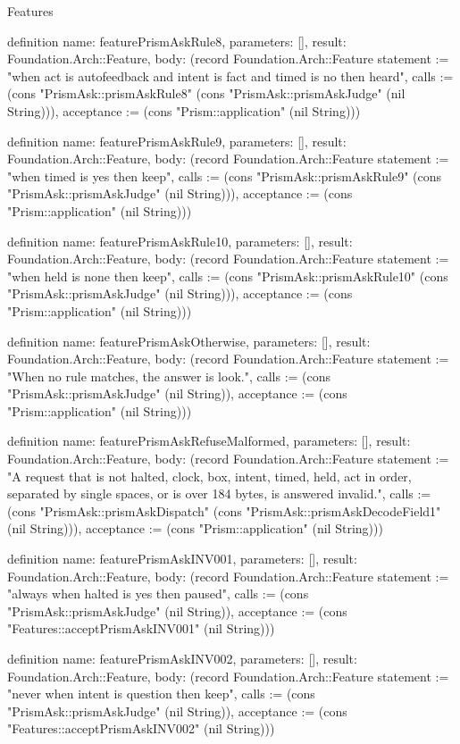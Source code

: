 \begin{lexlean}{Features}
\begin{semanticmodule}
definition{
  name: featurePrismAskRule8,
  parameters: [],
  result: Foundation.Arch::Feature,
  body: (record Foundation.Arch::Feature {statement := "when act is autofeedback and intent is fact and timed is no then heard", calls := (cons "PrismAsk::prismAskRule8" (cons "PrismAsk::prismAskJudge" (nil String))), acceptance := (cons "Prism::application" (nil String))})
}

definition{
  name: featurePrismAskRule9,
  parameters: [],
  result: Foundation.Arch::Feature,
  body: (record Foundation.Arch::Feature {statement := "when timed is yes then keep", calls := (cons "PrismAsk::prismAskRule9" (cons "PrismAsk::prismAskJudge" (nil String))), acceptance := (cons "Prism::application" (nil String))})
}

definition{
  name: featurePrismAskRule10,
  parameters: [],
  result: Foundation.Arch::Feature,
  body: (record Foundation.Arch::Feature {statement := "when held is none then keep", calls := (cons "PrismAsk::prismAskRule10" (cons "PrismAsk::prismAskJudge" (nil String))), acceptance := (cons "Prism::application" (nil String))})
}

definition{
  name: featurePrismAskOtherwise,
  parameters: [],
  result: Foundation.Arch::Feature,
  body: (record Foundation.Arch::Feature {statement := "When no rule matches, the answer is look.", calls := (cons "PrismAsk::prismAskJudge" (nil String)), acceptance := (cons "Prism::application" (nil String))})
}

definition{
  name: featurePrismAskRefuseMalformed,
  parameters: [],
  result: Foundation.Arch::Feature,
  body: (record Foundation.Arch::Feature {statement := "A request that is not halted, clock, box, intent, timed, held, act in order, separated by single spaces, or is over 184 bytes, is answered invalid.", calls := (cons "PrismAsk::prismAskDispatch" (cons "PrismAsk::prismAskDecodeField1" (nil String))), acceptance := (cons "Prism::application" (nil String))})
}

definition{
  name: featurePrismAskINV001,
  parameters: [],
  result: Foundation.Arch::Feature,
  body: (record Foundation.Arch::Feature {statement := "always when halted is yes then paused", calls := (cons "PrismAsk::prismAskJudge" (nil String)), acceptance := (cons "Features::acceptPrismAskINV001" (nil String))})
}

definition{
  name: featurePrismAskINV002,
  parameters: [],
  result: Foundation.Arch::Feature,
  body: (record Foundation.Arch::Feature {statement := "never when intent is question then keep", calls := (cons "PrismAsk::prismAskJudge" (nil String)), acceptance := (cons "Features::acceptPrismAskINV002" (nil String))})
}


\end{semanticmodule}
\end{lexlean}

